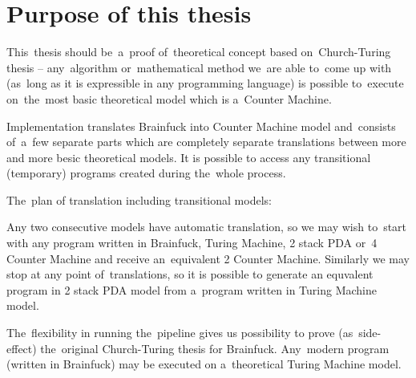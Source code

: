 \documentclass[english,shortabstract,mgr]{iithesis}
\begin{document}
\section {Purpose of this thesis}

This~thesis should be~a~proof of~theoretical concept based on~Church-Turing thesis -- any~algorithm
or~mathematical method we~are able to~come up with (as~long as it is expressible in any programming
language) is possible to~execute on~the~most basic theoretical model which is a~Counter Machine.

Implementation translates Brainfuck into Counter Machine model and~consists of~a~few separate parts
which are completely separate translations between more and more besic theoretical models.
It is possible to access any transitional (temporary) programs created during the~whole process.

The~plan of translation including transitional models:

\hspace{-1.5cm}

Any two consecutive models have automatic translation, so we may wish to~start with any program written
in Brainfuck, Turing Machine, 2 stack PDA or~4 Counter Machine and receive an~equivalent 2 Counter Machine.
Similarly we may stop at any point of~translations, so it is possible to generate an equvalent program
in 2 stack PDA model from a~program written in Turing Machine model.

The~flexibility in running the~pipeline gives us possibility to prove (as~side-effect)
the~original Church-Turing thesis for Brainfuck. Any~modern program (written in Brainfuck) may be executed
on a~theoretical Turing Machine model.
\end{document}
